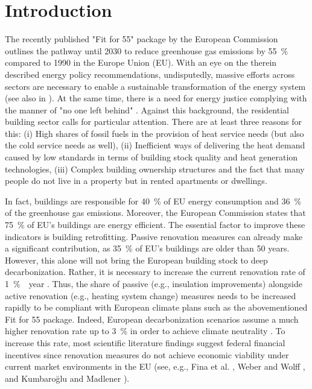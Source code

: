 \section{Introduction}
The recently published "Fit for 55" package \cite{european_commission_european_2019} by the European Commission outlines the pathway until 2030 to reduce greenhouse gas emissions by \SI{55}{\%} compared to 1990 in the Europe Union (EU). With an eye on the therein described energy policy recommendations, undisputedly, massive efforts across sectors are necessary to enable a sustainable transformation of the energy system (see also in \cite{korkmaz2020comparison}). At the same time, there is a need for energy justice complying with the manner of "no one left behind" \cite{sovacool2019decarbonization}. Against this background, the residential building sector calls for particular attention. There are at least three reasons for this: (i) High shares of fossil fuels in the provision of heat service needs (but also the cold service needs as well), (ii) Inefficient ways of delivering the heat demand caused by low standards in terms of building stock quality and heat generation technologies, (iii) Complex building ownership structures and the fact that many people do not live in a property but in rented apartments or dwellings.\vspace{0.5cm}

In fact, buildings are responsible for \SI{40}{\%} of EU energy consumption and \SI{36}{\%} of the greenhouse gas emissions. Moreover, the European Commission states that \SI{75}{\%} of EU's buildings are energy efficient. The essential factor to improve these indicators is building retrofitting. Passive renovation measures can already make a significant contribution, as \SI{35}{\%} of EU's buildings are older than \SI{50}{} years. However, this alone will not bring the European building stock to deep decarbonization. Rather, it is necessary to increase the current renovation rate of \SI{1}{\% \per year} \cite{eurocombuildings2021}. Thus, the share of passive (e.g., insulation improvements) alongside active renovation (e.g., heating system change) measures needs to be increased rapidly to be compliant with European climate plans such as the abovementioned Fit for 55 package. Indeed, European decarbonization scenarios assume a much higher renovation rate up to \SI{3}{\%} in order to achieve climate neutrality \cite{korkmaz2020comparison}. To increase this rate, most scientific literature findings suggest federal financial incentives since renovation measures do not achieve economic viability under current market environments in the EU (see, e.g., Fina et al. \cite{fina2019profitability}, Weber and Wolff \cite{weber2018energy}, and Kumbaroğlu and Madlener \cite{kumbarouglu2012evaluation}).\vspace{0.5cm}

